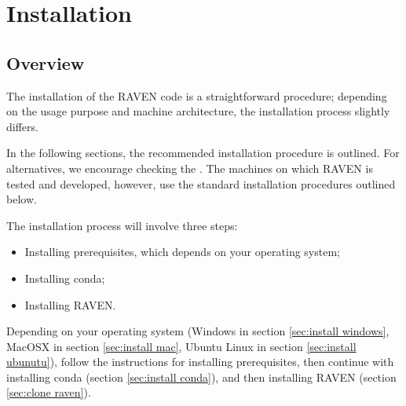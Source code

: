 \section{Installation}
\subsection{Overview}
\label{sec:install overview}

The installation of the RAVEN code is a straightforward procedure;
depending on the usage purpose and machine architecture, the
installation process slightly differs.

In the following sections, the recommended installation procedure is outlined.  For alternatives, we encourage
checking the \wiki.  The machines on which
RAVEN is tested and developed, however, use the standard installation procedures outlined below.

The installation process will involve three steps:
\begin{itemize}
  \item Installing prerequisites, which depends on your operating system;
  \item Installing conda;
  \item Installing RAVEN.
\end{itemize}

Depending on your operating system (Windows in section \ref{sec:install windows}, MacOSX in section
\ref{sec:install mac}, Ubuntu Linux in section \ref{sec:install ubunutu}), follow the instructions for installing prerequisites, then continue with
installing conda (section \ref{sec:install conda}), and then installing RAVEN (section \ref{sec:clone raven}).
